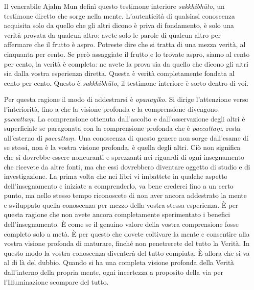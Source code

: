 Il venerabile Ajahn Mun definì questo testimone interiore
\emph{sakkhibhūto}, un testimone diretto che sorge nella mente.
L'autenticità di qualsiasi conoscenza acquisita solo da quello che gli
altri dicono è priva di fondamento, è solo una verità provata da qualcun
altro: avete solo le parole di qualcun altro per affermare che il frutto
è aspro. Potreste dire che si tratta di una mezza verità, al cinquanta
per cento. Se però assaggiate il frutto e lo trovate aspro, siamo al
cento per cento, la verità è completa: ne avete la prova sia da quello
che dicono gli altri sia dalla vostra esperienza diretta. Questa è
verità completamente fondata al cento per cento. Questo è
\emph{sakkhibhūto}, il testimone interiore è sorto dentro di voi.

Per questa ragione il modo di addestrarsi è \emph{opanayiko}. Si dirige
l'attenzione verso l'interiorità, fino a che la visione profonda e la
comprensione divengono \emph{paccattaṃ}. La comprensione ottenuta
dall'ascolto e dall'osservazione degli altri è superficiale se
paragonata con la comprensione profonda che è \emph{paccattaṃ}, resta
all'esterno di \emph{paccattaṃ}. Una conoscenza di questo genere non
sorge dall'esame di se stessi, non è la vostra visione profonda, è
quella degli altri. Ciò non significa che si dovrebbe essere noncuranti
e sprezzanti nei riguardi di ogni insegnamento che ricevete da altre
fonti, ma che essi dovrebbero diventare oggetto di studio e di
investigazione. La prima volta che nei libri vi imbattete in qualche
aspetto dell'insegnamento e iniziate a comprenderlo, va bene crederci
fino a un certo punto, ma nello stesso tempo riconoscete di non aver
ancora addestrato la mente e sviluppato quella conoscenza per mezzo
della vostra stessa esperienza. È per questa ragione che non avete
ancora completamente sperimentato i benefici dell'insegnamento. È come
se il genuino valore della vostra comprensione fosse completo solo a
metà. È per questo che dovete coltivare la mente e consentire alla
vostra visione profonda di maturare, finché non penetrerete del tutto la
Verità. In questo modo la vostra conoscenza diventerà del tutto
compiuta. È allora che si va al di là del dubbio. Quando si ha una
completa visione profonda della Verità dall'interno della propria mente,
ogni incertezza a proposito della via per l'Illuminazione scompare del
tutto.


